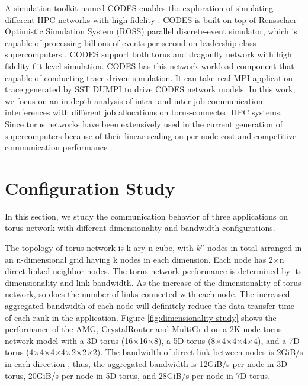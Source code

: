 \documentclass[conference]{IEEEtran}
\begin{document}

A simulation toolkit named CODES enables the exploration of simulating different HPC networks with high fidelity \cite{Jason-2011}\cite{mubarak-sc2012}. CODES is built on top of Rensselaer Optimistic Simulation System (ROSS) parallel discrete-event simulator, which is capable of processing billions of events per second on leadership-class supercomputers \cite{ross}. CODES support both torus and dragonfly network with high fidelity flit-level simulation. CODES has this network workload component that capable of conducting trace-driven simulation. It can take real MPI application trace generated by SST DUMPI \cite{sst} to drive CODES network models. In this work, we focus on an in-depth analysis of intra- and inter-job communication interferences with  different job allocations on torus-connected HPC systems. Since torus networks have been extensively used in the current generation of supercomputers because of their linear scaling on per-node cost and competitive communication performance \cite{mubarak-sc2012}\cite{zhou-ipdps}.


\section{Configuration Study }
\label{sec:config study}

In this section, we study the communication behavior of three applications on torus network with different dimensionality and bandwidth configurations.

The topology of torus network is k-ary n-cube, with $k^n$ nodes in total arranged in an n-dimensional grid having k nodes in each dimension. Each node has 2$\times$n direct linked neighbor nodes. The torus network performance is determined by its dimensionality and link bandwidth. As the increase of the dimensionality of torus network, so does the number of links connected with each node. The increased aggregated bandwidth of each node will definitely reduce the data transfer time of each rank in the application. Figure \ref{fig:dimensionality-study} shows the performance of the AMG, CrystalRouter and MultiGrid on a 2K node torus network model with a 3D torus (16$\times$16$\times$8), a 5D torus (8$\times$4$\times$4$\times$4$\times$4), and a 7D torus (4$\times$4$\times$4$\times$4$\times$2$\times$2$\times$2). The bandwidth of direct link between nodes is 2GiB/s in each direction \cite{bgq}, thus, the aggregated bandwidth is 12GiB/s per node in 3D torus, 20GiB/s per node in 5D torus, and 28GiB/s per node in 7D torus.
\end{document}
